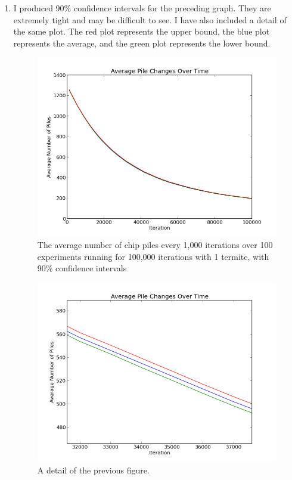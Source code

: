 \documentclass{article}
\begin{document}
\begin{enumerate}
\item{} %

I produced 90\% confidence intervals for the preceding graph. They are extremely
tight and may be difficult to see. I have also included a detail of the same
plot. The red plot represents the upper bound, the blue plot represents the
average, and the green plot represents the lower bound.

\begin{figure}[H]
\centering
\includegraphics[width=\textwidth]{figs/part_4_1.png}
\caption{The average number of chip piles every 1,000 iterations over 100
experiments running for 100,000 iterations with 1 termite, with 90\% confidence
intervals}
\end{figure}

\begin{figure}[H]
\centering
\includegraphics[width=\textwidth]{figs/part_4_2.png}
\caption{A detail of the previous figure.}
\end{figure}


\end{enumerate}
\end{document}
